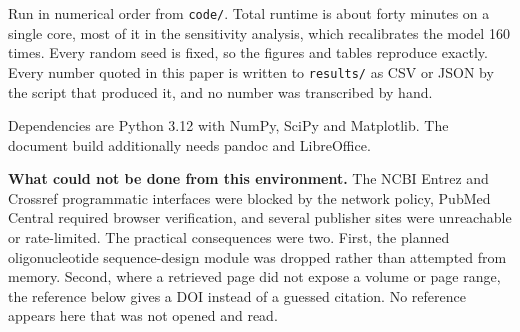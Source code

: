 \documentclass[conference]{IEEEtran}
\begin{document}
Run in numerical order from \texttt{code/\allowbreak{}}. Total runtime is about forty minutes on a single core, most of it in the sensitivity analysis, which recalibrates the model 160 times. Every random seed is fixed, so the figures and tables reproduce exactly. Every number quoted in this paper is written to \texttt{results/\allowbreak{}} as CSV or JSON by the script that produced it, and no number was transcribed by hand.

Dependencies are Python 3.12 with NumPy, SciPy and Matplotlib. The document build additionally needs pandoc and LibreOffice.

\textbf{What could not be done from this environment.} The NCBI Entrez and Crossref programmatic interfaces were blocked by the network policy, PubMed Central required browser verification, and several publisher sites were unreachable or rate-limited. The practical consequences were two. First, the planned oligonucleotide sequence-design module was dropped rather than attempted from memory. Second, where a retrieved page did not expose a volume or page range, the reference below gives a DOI instead of a guessed citation. No reference appears here that was not opened and read.
\end{document}
